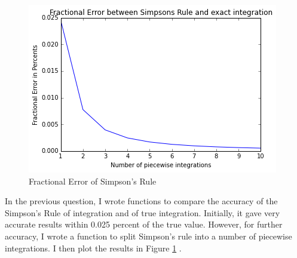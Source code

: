 \documentclass{article}
\begin{document}
\begin{figure}[h]
  \caption{Fractional Error of Simpson's Rule}
  \label{myplot}
  \centering
  \includegraphics[scale=0.5]{q3.png}
\end{figure}

In the previous question, I wrote functions to compare the accuracy of the
Simpson's Rule of integration and of true integration. Initially, it gave very
accurate results within 0.025 percent of the true value. However, for further 
accuracy, I wrote a function to split Simpson's rule into a number of piecewise
integrations. I then plot the results in Figure \ref{myplot} . 
\end{document}

